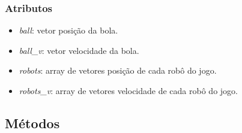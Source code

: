 \subsubsection*{Atributos}

\begin{itemize}
  \item \textit{ball}: vetor posição da bola.
  \item \textit{ball_v}: vetor velocidade da bola.
  \item \textit{robots}: array de vetores posição de cada robô do jogo.
  \item \textit{robots_v}: array de vetores velocidade de cada robô do jogo.
\end{itemize}

\subsection*{Métodos}

